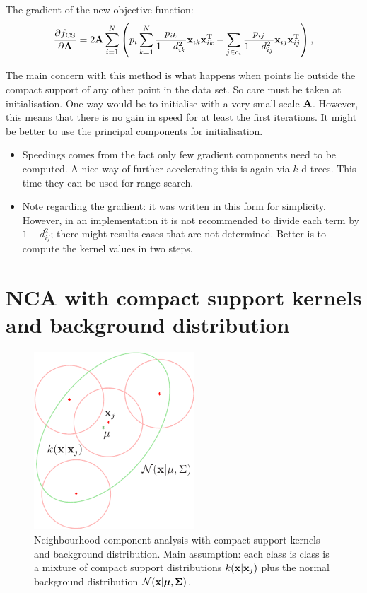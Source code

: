 The gradient of the new objective function:
\begin{align}
	\frac{\partial f_\text{CS}}{\partial \mathbf{A}}=2\mathbf{A}\sum_{i=1}^{N}
	\left(
	p_i \sum_{k=1}^N \frac{p_{ik}}{1-d_{ik}^2} \mathbf{x}_{ik}\mathbf{x}_{ik}^{\textrm{T}}
	- \sum_{j\in c_i} \frac{p_{ij}}{1-d_{ij}^2}\mathbf{x}_{ij}\mathbf{x}_{ij}^{\textrm{T}} 
	\right)
	\label{eq:nca-cs-grad},
\end{align}

The main concern with this method is what happens when points lie outside the compact support of any other point in the data set. So care must be taken at initialisation. One way would be to initialise with a very small scale $\mathbf{A}$. However, this means that there is no gain in speed for at least the first iterations. It might be better to use the principal components for initialisation. 

\begin{itemize}
	\item Speedings comes from the fact only few gradient components need to be computed. A nice way of further accelerating this is again via $k$-d trees. This time they can be used for range search. 
	\item Note regarding the gradient: it was written in this form for simplicity. However, in an implementation it is not recommended to divide each term by $1-d_{ij}^2$; there might results cases that are not determined. Better is to compute the kernel values in two steps.
\end{itemize}

\section{NCA with compact support kernels and background distribution}
\label{sec:nca-cs-back}


\begin{figure}
  \centering\includegraphics[width=6cm]{images/nca-cs-back}
  \caption{Neighbourhood component analysis with compact support kernels and background distribution. Main assumption: each class is class is a mixture of compact support distributions $k(\mathbf{x}|\mathbf{x}_j)$ plus the normal background distribution $\mathcal{N}(\mathbf{x}|\mbox{\boldmath $\mu$},\mbox{\boldmath $\Sigma$})$.}
  \label{fig:cs-back}
\end{figure}

